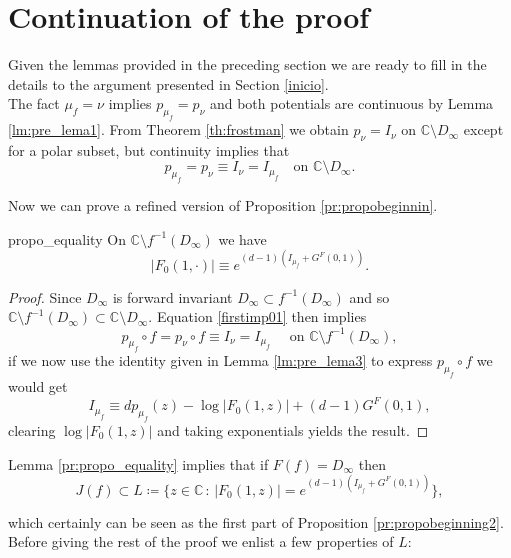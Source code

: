 \section{Continuation of the proof}\label{continuax}

Given the lemmas provided in the preceding section we are ready to fill in the details to the argument presented in Section \ref{inicio}.\\

The fact $\mu_f = \nu$ implies $p_{\mu_f} = p_\nu$ and both potentials are continuous by Lemma \ref{lm:pre_lema1}. From Theorem \ref{th:frostman} we obtain $p_\nu = I_\nu$ on $\mathbb{C}\setminus D_\infty$ except for a polar subset, but continuity implies that
\begin{equation}\label{firstimp01}
p_{\mu_f} = p_\nu \equiv I_\nu = I_{\mu_f} \quad \text{on }\mathbb{C}\setminus D_\infty.
\end{equation}

Now we can prove a refined version of Proposition \ref{pr:propobeginnin}.

\begin{myprop}{}{propo_equality}
On $\mathbb{C}\setminus f^{-1}(D_\infty)$ we have
$$|F_0(1,\cdot)|  \equiv e^{(d-1)(I_{\mu_f} + G^F(0,1))}.$$
\end{myprop}

\begin{proof}
Since $D_\infty$ is forward invariant $D_\infty \subset f^{-1}(D_\infty)$ and so $\mathbb{C} \setminus f^{-1}(D_\infty) \subset \mathbb{C} \setminus D_\infty$. Equation \eqref{firstimp01} then implies
$$p_{\mu_f} \circ f = p_{\nu} \circ f \equiv I_\nu =I_{\mu_f} \quad \text{ on } \mathbb{C}\setminus f^{-1}(D_\infty),$$
if we now use the identity given in Lemma \ref{lm:pre_lema3} to express $p_{\mu_f}\circ f$ we would get
$$I_{\mu_f} \equiv d p_{\mu_f}(z) - \log|F_0(1,z)| + (d-1)G^F(0,1),$$
clearing $\log|F_0(1,z)|$ and taking exponentials yields the result.
\end{proof}

Lemma \ref{pr:propo_equality} implies that if $F(f) = D_\infty$ then 
$$J(f) \subset L \coloneqq \{z\in \mathbb{C} \,:\, |F_0(1,z)| =  e^{(d-1)(I_{\mu_f} + G^F(0,1))} \},$$

which certainly can be seen as the first part of Proposition \ref{pr:propobeginning2}. Before giving the rest of the proof we enlist a few properties of $L$:

